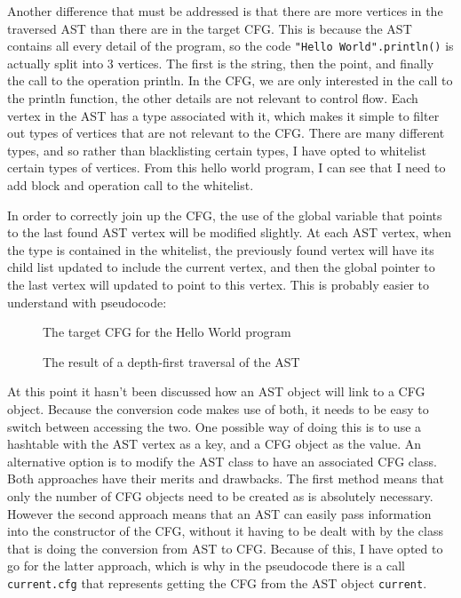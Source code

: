 Another difference that must be addressed is that there are more vertices in the traversed AST than there are in the target CFG. This is because the AST contains all every detail of the program, so the code \verb|"Hello World".println()| is actually split into 3 vertices. The first is the string, then the point, and finally the call to the operation println. In the CFG, we are only interested in the call to the println function, the other details are not relevant to control flow. Each vertex in the AST has a type associated with it, which makes it simple to filter out types of vertices that are not relevant to the CFG. There are many different types, and so rather than blacklisting certain types, I have opted to whitelist certain types of vertices. From this hello world program, I can see that I need to add block and operation call to the whitelist.

In order to correctly join up the CFG, the use of the global variable that points to the last found AST vertex will be modified slightly. At each AST vertex, when the type is contained in the whitelist, the previously found vertex will have its child list updated to include the current vertex, and then the global pointer to the last vertex will updated to point to this vertex. This is probably easier to understand with pseudocode:



\begin{figure}
\centering
\begin{minipage}{.4\textwidth}
  \centering
    \caption{The target CFG for the Hello World program}
    \label{fig:helloWorldCFG}
\end{minipage}%
\begin{minipage}{.15\textwidth}
\hspace{1cm}
\end{minipage}
\begin{minipage}{.4\textwidth}
  \centering
  \caption{The result of a depth-first traversal of the AST}
  \label{fig:helloWorldDF}
\end{minipage}
\end{figure}

At this point it hasn't been discussed how an AST object will link to a CFG object. Because the conversion code makes use of both, it needs to be easy to switch between accessing the two. One possible way of doing this is to use a hashtable with the AST vertex as a key, and a CFG object as the value. An alternative option is to modify the AST class to have an associated CFG class. Both approaches have their merits and drawbacks. The first method means that only the number of CFG objects need to be created as is absolutely necessary. However the second approach means that an AST can easily pass information into the constructor of the CFG, without it having to be dealt with by the class that is doing the conversion from AST to CFG. Because of this, I have opted to go for the latter approach, which is why in the pseudocode there is a call \verb|current.cfg| that represents getting the CFG from the AST object \verb|current|.

